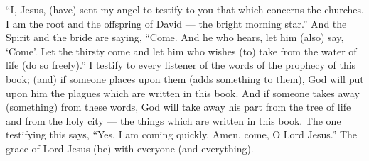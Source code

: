 \begin{pages}
\begin{Leftside}
		\pend
		\pstart
		“I, Jesus, (have) sent my angel to testify to you that which concerns the churches. I am the root and the offspring of David — the bright morning star.” And the Spirit and the bride are saying, “Come. And he who hears, let him (also) say, ‘Come’. Let the thirsty come and let him who wishes (to) take from the water of life (do so freely).”
		\pend
		\pstart
		I testify to every listener of the words of the prophecy of this book; (and) if someone places upon them (adds something to them), God will put upon him the plagues which are written in this book. And if someone takes away (something) from these words, God will take away his part from the tree of life and from the holy city — the things which are written in this book. The one testifying this says, “Yes. I am coming quickly. Amen, come, O Lord Jesus.”
		\pend
		\pstart
		The grace of Lord Jesus (be) with everyone (and everything). 
		\pend
        \endnumbering
    \end{Leftside}

\end{pages} 
\Pages

